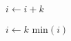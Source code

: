 \documentclass{article}
\begin{document}
\begin{algorithmic}

	\State $i\gets i+k$

\EndIf

	\State $i \gets k$
	\State $\text{min}(i)$
	
\EndPForeach



\end{algorithmic}
\end{document}
